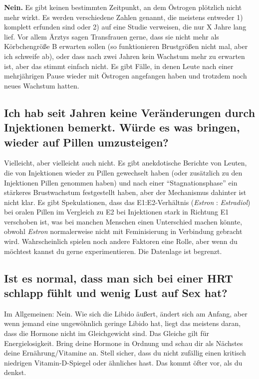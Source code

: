 \documentclass{article}
\begin{document}
\textbf{Nein.} Es gibt keinen bestimmten Zeitpunkt, an dem Östrogen plötzlich nicht mehr wirkt. Es werden verschiedene Zahlen genannt, die meistens entweder 1) komplett erfunden sind oder 2) auf eine Studie verweisen, die nur X Jahre lang lief. Vor allem Ärztys sagen Transfrauen gerne, dass sie nicht mehr als Körbchengröße B erwarten sollen (so funktionieren Brustgrößen nicht mal, aber ich schweife ab), oder dass nach zwei Jahren kein Wachstum mehr zu erwarten ist, aber das stimmt einfach nicht. Es gibt Fälle, in denen Leute nach einer mehrjährigen Pause wieder mit Östrogen angefangen haben und trotzdem noch neues Wachstum hatten.

\subsection{Ich hab seit Jahren keine Veränderungen durch Injektionen bemerkt. Würde es was bringen, wieder auf Pillen umzusteigen?}

Vielleicht, aber vielleicht auch nicht. Es gibt anekdotische Berichte von Leuten, die von Injektionen wieder zu Pillen gewechselt haben (oder zusätzlich zu den Injektionen Pillen genommen haben) und nach einer “Stagnationsphase” ein stärkeres Brustwachstum festgestellt haben, aber der Mechanismus dahinter ist nicht klar. Es gibt Spekulationen, dass das E1:E2-Verhältnis (\textit{Estron} : \textit{Estradiol}) bei oralen Pillen im Vergleich zu E2 bei Injektionen stark in Richtung E1 verschoben ist, was bei manchen Menschen einen Unterschied machen könnte, obwohl \textit{Estron} normalerweise nicht mit Feminisierung in Verbindung gebracht wird. Wahrscheinlich spielen noch andere Faktoren eine Rolle, aber wenn du möchtest kannst du gerne experimentieren. Die Datenlage ist begrenzt.

\subsection{Ist es normal, dass man sich bei einer HRT schlapp fühlt und wenig Lust auf Sex hat?}

Im Allgemeinen: Nein. Wie sich die Libido äußert, ändert sich am Anfang, aber wenn jemand eine ungewöhnlich geringe Libido hat, liegt das meistens daran, dass die Hormone nicht im Gleichgewicht sind. Das Gleiche gilt für Energielosigkeit. Bring deine Hormone in Ordnung und schau dir als Nächstes deine Ernährung/Vitamine an. Stell sicher, dass du nicht zufällig einen kritisch niedrigen Vitamin-D-Spiegel oder ähnliches hast. Das kommt öfter vor, als du denkst.
\end{document}
